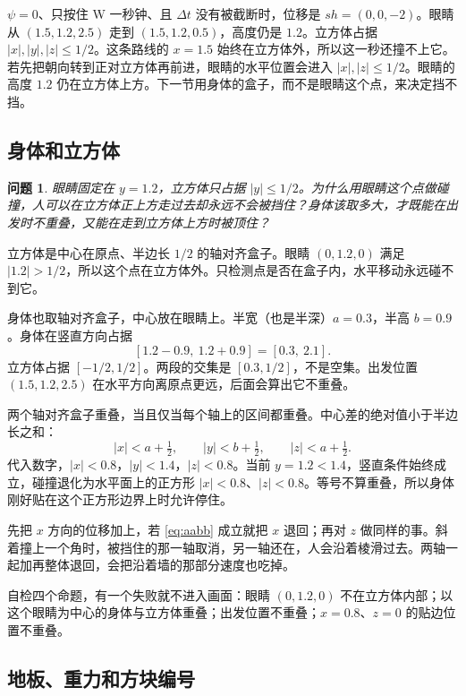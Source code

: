 \documentclass[12pt,a4paper]{article}
\theoremstyle{definition}
\theoremstyle{plain}
\newtheorem{problem}{问题}[section]
\theoremstyle{remark}
\begin{document}
$\psi=0$、只按住 W 一秒钟、且 $\Delta t$ 没有被截断时，位移是 $s h=(0,0,-2)$。眼睛从 $(1.5,1.2,2.5)$ 走到 $(1.5,1.2,0.5)$，高度仍是 $1.2$。立方体占据 $|x|,|y|,|z|\le 1/2$。这条路线的 $x=1.5$ 始终在立方体外，所以这一秒还撞不上它。若先把朝向转到正对立方体再前进，眼睛的水平位置会进入 $|x|,|z|\le 1/2$。眼睛的高度 $1.2$ 仍在立方体上方。下一节用身体的盒子，而不是眼睛这个点，来决定挡不挡。

\subsection{身体和立方体}

\begin{problem}
眼睛固定在 $y=1.2$，立方体只占据 $|y|\le 1/2$。为什么用眼睛这个点做碰撞，人可以在立方体正上方走过去却永远不会被挡住？身体该取多大，才既能在出发时不重叠，又能在走到立方体上方时被顶住？
\end{problem}

立方体是中心在原点、半边长 $1/2$ 的轴对齐盒子。眼睛 $(0,1.2,0)$ 满足 $|1.2|>1/2$，所以这个点在立方体外。只检测点是否在盒子内，水平移动永远碰不到它。

身体也取轴对齐盒子，中心放在眼睛上。半宽（也是半深）$a=0.3$，半高 $b=0.9$。身体在竖直方向占据
\[
[1.2-0.9,\ 1.2+0.9]=[0.3,\ 2.1].
\]
立方体占据 $[-1/2,1/2]$。两段的交集是 $[0.3,1/2]$，不是空集。出发位置 $(1.5,1.2,2.5)$ 在水平方向离原点更远，后面会算出它不重叠。

两个轴对齐盒子重叠，当且仅当每个轴上的区间都重叠。中心差的绝对值小于半边长之和：
\begin{equation}
|x|<a+\tfrac12,\qquad |y|<b+\tfrac12,\qquad |z|<a+\tfrac12.
\label{eq:aabb}
\end{equation}
代入数字，$|x|<0.8$，$|y|<1.4$，$|z|<0.8$。当前 $y=1.2<1.4$，竖直条件始终成立，碰撞退化为水平面上的正方形 $|x|<0.8$、$|z|<0.8$。等号不算重叠，所以身体刚好贴在这个正方形边界上时允许停住。

先把 $x$ 方向的位移加上，若 \eqref{eq:aabb} 成立就把 $x$ 退回；再对 $z$ 做同样的事。斜着撞上一个角时，被挡住的那一轴取消，另一轴还在，人会沿着棱滑过去。两轴一起加再整体退回，会把沿着墙的那部分速度也吃掉。

自检四个命题，有一个失败就不进入画面：眼睛 $(0,1.2,0)$ 不在立方体内部；以这个眼睛为中心的身体与立方体重叠；出发位置不重叠；$x=0.8$、$z=0$ 的贴边位置不重叠。

\subsection{地板、重力和方块编号}
\end{document}
